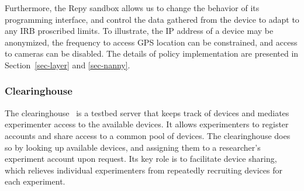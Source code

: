 Furthermore, the Repy sandbox allows us to change the 
behavior of its programming interface, and control the 
data gathered from the device to adapt to any IRB proscribed limits. 
To illustrate, the IP address of a device may be anonymized, 
the frequency to access GPS location can be constrained, and 
access to cameras can be disabled. 
The details of policy implementation are presented in 
Section~\ref{sec-layer} and \ref{sec-nanny}.

\subsubsection{Clearinghouse}\label{sec-ch}
The clearinghouse~\cite{ch} is a testbed server that keeps 
track of devices and mediates experimenter access to the 
available devices. It allows experimenters to register 
accounts and share access to a common pool of devices.
The clearinghouse does so by looking up available devices, and assigning
them to a researcher's experiment account upon request. 
Its key role is to facilitate device sharing, 
which relieves individual experimenters from repeatedly 
recruiting devices for each experiment.

